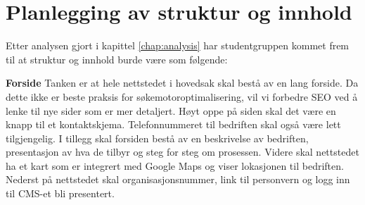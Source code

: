 









\section{Planlegging av struktur og innhold}
\label{sec:planning-website}

Etter analysen gjort i kapittel \ref{chap:analysis} har studentgruppen kommet frem til at struktur og innhold burde være som følgende: 

\textbf{Forside} Tanken er at hele nettstedet i hovedsak skal bestå av en lang forside. Da dette ikke er beste praksis for søkemotoroptimalisering, vil vi forbedre SEO ved å lenke til nye sider som er mer detaljert. Høyt oppe på siden skal det være en knapp til et kontaktskjema. Telefonnummeret til bedriften skal også være lett tilgjengelig. I tillegg skal forsiden bestå av en beskrivelse av bedriften, presentasjon av hva de tilbyr og steg for steg om prosessen. Videre skal nettstedet ha et kart som er integrert med Google Maps og viser lokasjonen til bedriften. Nederst på nettstedet skal organisasjonsnummer, link til personvern og logg inn til CMS-et bli presentert.

